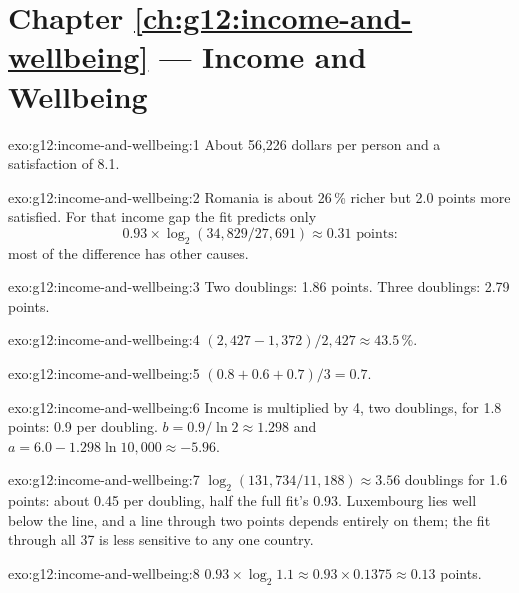 \section*{Chapter \ref{ch:g12:income-and-wellbeing} --- Income and Wellbeing}

\begin{solution}{exo:g12:income-and-wellbeing:1}
About 56,226 dollars per person and a satisfaction of 8.1.
\end{solution}

\begin{solution}{exo:g12:income-and-wellbeing:2}
Romania is about 26\,\% richer but 2.0 points more satisfied. For that income gap the fit predicts only
\[0.93 \times \log_2(34{,}829/27{,}691) \approx 0.31 \text{ points:}\]
most of the difference has other causes.
\end{solution}

\begin{solution}{exo:g12:income-and-wellbeing:3}
Two doublings: 1.86 points. Three doublings: 2.79 points.
\end{solution}

\begin{solution}{exo:g12:income-and-wellbeing:4}
$(2{,}427 - 1{,}372)/2{,}427 \approx 43.5\,\%$.
\end{solution}

\begin{solution}{exo:g12:income-and-wellbeing:5}
$(0.8 + 0.6 + 0.7)/3 = 0.7$.
\end{solution}

\begin{solution}{exo:g12:income-and-wellbeing:6}
Income is multiplied by 4, two doublings, for 1.8 points: 0.9 per doubling. $b = 0.9/\ln 2 \approx 1.298$ and $a = 6.0 - 1.298 \ln 10{,}000 \approx -5.96$.
\end{solution}

\begin{solution}{exo:g12:income-and-wellbeing:7}
$\log_2(131{,}734/11{,}188) \approx 3.56$ doublings for 1.6 points: about 0.45 per doubling, half the full fit's 0.93. Luxembourg lies well below the line, and a line through
two points depends entirely on them; the fit through all 37 is less sensitive to any one country.
\end{solution}

\begin{solution}{exo:g12:income-and-wellbeing:8}
$0.93 \times \log_2 1.1 \approx 0.93 \times 0.1375 \approx 0.13$ points.
\end{solution}

